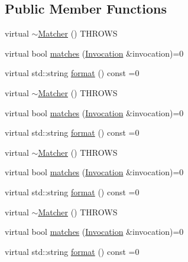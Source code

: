 \subsection*{Public Member Functions}
\begin{DoxyCompactItemize}
\item 
virtual \mbox{\hyperlink{structfakeit_1_1Invocation_1_1Matcher_a8ef7a354a03360f00c193e3db12d2293}{$\sim$\+Matcher}} () T\+H\+R\+O\+WS
\item 
virtual bool \mbox{\hyperlink{structfakeit_1_1Invocation_1_1Matcher_a77b45c801fe29889c148516df1ffcb06}{matches}} (\mbox{\hyperlink{structfakeit_1_1Invocation}{Invocation}} \&invocation)=0
\item 
virtual std\+::string \mbox{\hyperlink{structfakeit_1_1Invocation_1_1Matcher_af570f2942a21d89cb3a09889bd9ac6f2}{format}} () const =0
\item 
virtual \mbox{\hyperlink{structfakeit_1_1Invocation_1_1Matcher_a8ef7a354a03360f00c193e3db12d2293}{$\sim$\+Matcher}} () T\+H\+R\+O\+WS
\item 
virtual bool \mbox{\hyperlink{structfakeit_1_1Invocation_1_1Matcher_a77b45c801fe29889c148516df1ffcb06}{matches}} (\mbox{\hyperlink{structfakeit_1_1Invocation}{Invocation}} \&invocation)=0
\item 
virtual std\+::string \mbox{\hyperlink{structfakeit_1_1Invocation_1_1Matcher_af570f2942a21d89cb3a09889bd9ac6f2}{format}} () const =0
\item 
virtual \mbox{\hyperlink{structfakeit_1_1Invocation_1_1Matcher_a8ef7a354a03360f00c193e3db12d2293}{$\sim$\+Matcher}} () T\+H\+R\+O\+WS
\item 
virtual bool \mbox{\hyperlink{structfakeit_1_1Invocation_1_1Matcher_a77b45c801fe29889c148516df1ffcb06}{matches}} (\mbox{\hyperlink{structfakeit_1_1Invocation}{Invocation}} \&invocation)=0
\item 
virtual std\+::string \mbox{\hyperlink{structfakeit_1_1Invocation_1_1Matcher_af570f2942a21d89cb3a09889bd9ac6f2}{format}} () const =0
\item 
virtual \mbox{\hyperlink{structfakeit_1_1Invocation_1_1Matcher_a8ef7a354a03360f00c193e3db12d2293}{$\sim$\+Matcher}} () T\+H\+R\+O\+WS
\item 
virtual bool \mbox{\hyperlink{structfakeit_1_1Invocation_1_1Matcher_a77b45c801fe29889c148516df1ffcb06}{matches}} (\mbox{\hyperlink{structfakeit_1_1Invocation}{Invocation}} \&invocation)=0
\item 
virtual std\+::string \mbox{\hyperlink{structfakeit_1_1Invocation_1_1Matcher_af570f2942a21d89cb3a09889bd9ac6f2}{format}} () const =0

\end{DoxyCompactItemize}
